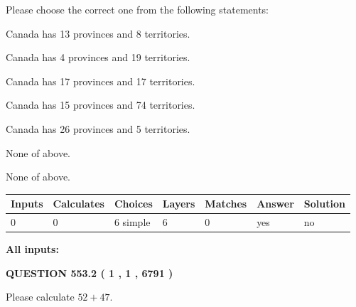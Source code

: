 \documentclass[12pt]{article}
\begin{document}
  
Please choose the correct one from the following statements:
 
 
Canada has  13 provinces and  8 territories.
 
 
Canada has   4 provinces and  19 territories.
 
 
Canada has  17 provinces and  17 territories.
 
 
Canada has  15 provinces and  74 territories.
 
 
Canada has  26 provinces and  5 territories.
 
 
 None of above.
 
 
\noindent{}
 
 
 None of above.
 
 
\noindent{}
 
 
   
   
   
   
\noindent\begin{tabular}{|l|l|l|l|l|l|l|}
 \hline
Inputs & Calculates & Choices & Layers & Matches & Answer & Solution \\ \hline
 0  & 
 0  & 
 6
  simple  
  & 
 6  & 
 0  & 
  yes & 
  no 
  \\ \hline
 \end{tabular}
   
   
   
   
\noindent{}
   
   
   
   
\noindent\vspace{0.1in}\hspace{-0.08in} {\textbf{\Large{All inputs: }}}
   
   
  
\vspace{0.2in}
  
{\textbf{\Large{QUESTION
553.2 
 ( 1 , 1 , 6791 )
}}}
  
  
 
Please calculate $ %
52 +  %
47 $.
 
 
 
\end{document}
